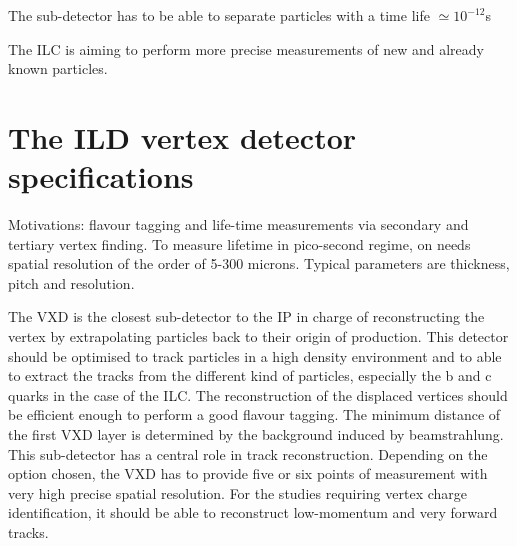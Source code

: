   The sub-detector has to be able to separate particles with a time life $\simeq 10^{-12}$s  


  The \gls{ILC} is aiming to perform more precise measurements of new and already known particles. 

  \minitoc
  
  \section{The ILD vertex detector specifications}
   





    Motivations: flavour tagging and life-time measurements via secondary and tertiary vertex finding. 
    To measure lifetime in pico-second regime, on needs spatial resolution of the order of 5-300 microns.
    Typical parameters are thickness, pitch and resolution.
    

    The \gls{VXD} is the closest sub-detector to the \gls{IP} in charge of reconstructing the vertex by extrapolating particles back to their origin of production. 
    This detector should be optimised to track particles in a high density environment and to able to extract the tracks from the different kind of particles, especially the b and c quarks in the case of the \gls{ILC}.
    The reconstruction of the displaced vertices should be efficient enough to perform a good flavour tagging.
    The minimum distance of the first \gls{VXD} layer is determined by the background induced by beamstrahlung.
    This sub-detector has a central role in track reconstruction.
    Depending on the option chosen, the \gls{VXD} has to provide five or six points of measurement with very high precise spatial resolution.
    For the studies requiring vertex charge identification, it should be able to reconstruct low-momentum and very forward tracks.
   

